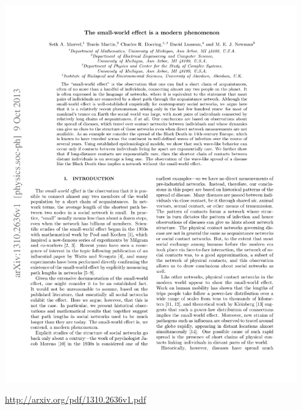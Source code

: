 \documentclass[aspectratio=169]{beamer}
\begin{document}
\begin{frame}

\begin{center}
\includegraphics[width = 0.95\textwidth]{figures/marvel_small-world_2013_title}
\end{center}


\tiny{\url{http://arxiv.org/pdf/1310.2636v1.pdf}}


\end{frame}
\end{document}
